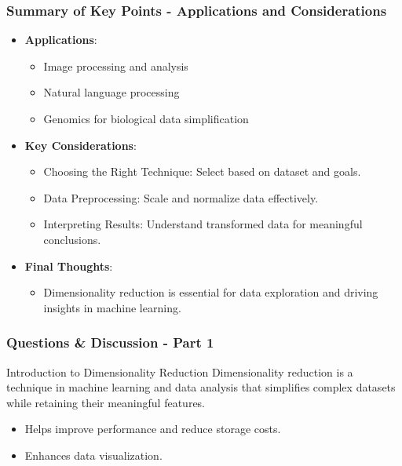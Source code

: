 \documentclass[aspectratio=169]{beamer}
\begin{document}
\begin{frame}[fragile]
    \frametitle{Summary of Key Points - Applications and Considerations}
    \begin{itemize}
        \item \textbf{Applications}:
        \begin{itemize}
            \item Image processing and analysis
            \item Natural language processing
            \item Genomics for biological data simplification
        \end{itemize}
        
        \item \textbf{Key Considerations}:
        \begin{itemize}
            \item Choosing the Right Technique: Select based on dataset and goals.
            \item Data Preprocessing: Scale and normalize data effectively.
            \item Interpreting Results: Understand transformed data for meaningful conclusions.
        \end{itemize}

        \item \textbf{Final Thoughts}:
        \begin{itemize}
            \item Dimensionality reduction is essential for data exploration and driving insights in machine learning.
        \end{itemize}
    \end{itemize}
\end{frame}

\begin{frame}[fragile]
  \frametitle{Questions \& Discussion - Part 1}
  \begin{block}{Introduction to Dimensionality Reduction}
    Dimensionality reduction is a technique in machine learning and data analysis that simplifies complex datasets while retaining their meaningful features. 
    \begin{itemize}
      \item Helps improve performance and reduce storage costs.
      \item Enhances data visualization.
    \end{itemize}
  \end{block}
\end{frame}
\end{document}
